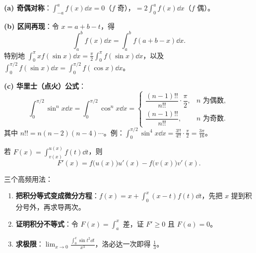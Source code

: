 
\textbf{(a) 奇偶对称}：$\displaystyle\int_{-a}^{a}f(x)\dd x=0$（$f$ 奇），$\displaystyle=2\int_0^a f(x)\dd x$（$f$ 偶）。

\textbf{(b) 区间再现}：令 $x=a+b-t$，得
\[
\int_a^b f(x)\dd x=\int_a^b f(a+b-x)\dd x .
\]
特别地 $\displaystyle\int_0^{\pi}xf(\sin x)\dd x=\frac{\pi}{2}\int_0^{\pi}f(\sin x)\dd x$，以及 $\displaystyle\int_0^{\pi/2}f(\sin x)\dd x=\int_0^{\pi/2}f(\cos x)\dd x$。

\textbf{(c) 华里士（点火）公式}：
\[
\int_0^{\pi/2}\sin^n x\dd x=\int_0^{\pi/2}\cos^n x\dd x=
\begin{cases}
\dfrac{(n-1)!!}{n!!}\cdot\dfrac{\pi}{2}, & n \text{ 为偶数},\\[6pt]
\dfrac{(n-1)!!}{n!!}, & n \text{ 为奇数}.
\end{cases}
\]
其中 $n!!=n(n-2)(n-4)\cdots$。例：$\int_0^{\pi/2}\sin^4x\dd x=\frac{3!!}{4!!}\cdot\frac\pi2=\frac{3\pi}{16}$。



若 $F(x)=\displaystyle\int_{v(x)}^{u(x)}f(t)\dd t$，则
\[
F'(x)=f\bigl(u(x)\bigr)u'(x)-f\bigl(v(x)\bigr)v'(x).
\]

三个高频用法：
\begin{enumerate}[leftmargin=1.8em,itemsep=1pt]
\item \textbf{把积分等式变成微分方程}：$f(x)=x+\int_0^x(x-t)f(t)\dd t$，先把 $x$ 提到积分号外，再求导两次。
\item \textbf{证明积分不等式}：令 $F(x)=\int_a^x$ 差，证 $F'\ge0$ 且 $F(a)=0$。
\item \textbf{求极限}：$\displaystyle\lim_{x\to0}\frac{\int_0^x\sin t^2\dd t}{x^3}$，洛必达一次即得 $\frac13$。
\end{enumerate}

